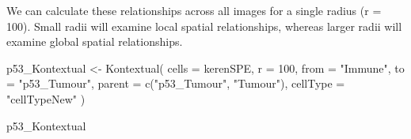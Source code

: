 \documentclass[
  letterpaper,
  DIV=11,
  numbers=noendperiod]{scrreprt}
\newenvironment{Shaded}{\begin{snugshade}}{\end{snugshade}}
\newcommand{\AttributeTok}[1]{\textcolor[rgb]{0.40,0.45,0.13}{#1}}
\newcommand{\DecValTok}[1]{\textcolor[rgb]{0.68,0.00,0.00}{#1}}
\newcommand{\FunctionTok}[1]{\textcolor[rgb]{0.28,0.35,0.67}{#1}}
\newcommand{\NormalTok}[1]{\textcolor[rgb]{0.00,0.23,0.31}{#1}}
\newcommand{\OtherTok}[1]{\textcolor[rgb]{0.00,0.23,0.31}{#1}}
\newcommand{\StringTok}[1]{\textcolor[rgb]{0.13,0.47,0.30}{#1}}
\begin{document}
We can calculate these relationships across all images for a single
radius (r = 100). Small radii will examine local spatial relationships,
whereas larger radii will examine global spatial relationships.

\begin{Shaded}
\begin{Highlighting}[]
\NormalTok{p53\_Kontextual }\OtherTok{\textless{}{-}} \FunctionTok{Kontextual}\NormalTok{(}
  \AttributeTok{cells =}\NormalTok{ kerenSPE,}
  \AttributeTok{r =} \DecValTok{100}\NormalTok{,}
  \AttributeTok{from =} \StringTok{"Immune"}\NormalTok{,}
  \AttributeTok{to =} \StringTok{"p53\_Tumour"}\NormalTok{,}
  \AttributeTok{parent =} \FunctionTok{c}\NormalTok{(}\StringTok{"p53\_Tumour"}\NormalTok{, }\StringTok{"Tumour"}\NormalTok{),}
  \AttributeTok{cellType =} \StringTok{"cellTypeNew"}
\NormalTok{)}

\NormalTok{p53\_Kontextual}
\end{Highlighting}
\end{Shaded}
\end{document}
